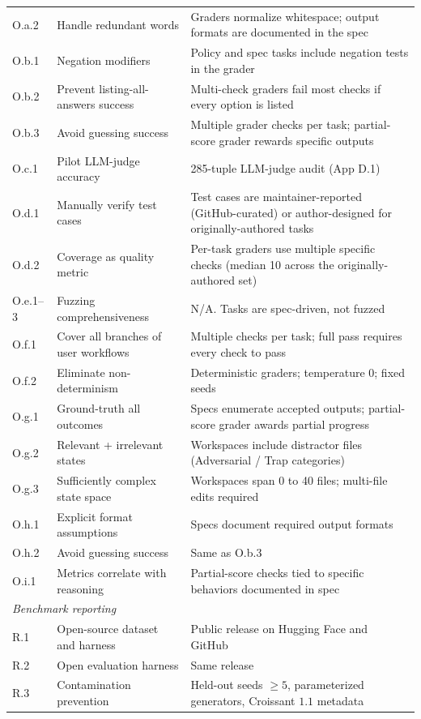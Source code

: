 \documentclass{article}
\begin{document}
\begin{table}[h]
\begin{tabular}{p{0.7cm}p{4.6cm}p{8.5cm}}
O.a.2 & Handle redundant words & Graders normalize whitespace; output formats are documented in the spec \\
O.b.1 & Negation modifiers & Policy and spec tasks include negation tests in the grader \\
O.b.2 & Prevent listing-all-answers success & Multi-check graders fail most checks if every option is listed \\
O.b.3 & Avoid guessing success & Multiple grader checks per task; partial-score grader rewards specific outputs \\
O.c.1 & Pilot LLM-judge accuracy & 285-tuple LLM-judge audit (App D.1) \\
O.d.1 & Manually verify test cases & Test cases are maintainer-reported (GitHub-curated) or author-designed for originally-authored tasks \\
O.d.2 & Coverage as quality metric & Per-task graders use multiple specific checks (median 10 across the originally-authored set) \\
O.e.1--3 & Fuzzing comprehensiveness & N/A. Tasks are spec-driven, not fuzzed \\
O.f.1 & Cover all branches of user workflows & Multiple checks per task; full pass requires every check to pass \\
O.f.2 & Eliminate non-determinism & Deterministic graders; temperature 0; fixed seeds \\
O.g.1 & Ground-truth all outcomes & Specs enumerate accepted outputs; partial-score grader awards partial progress \\
O.g.2 & Relevant + irrelevant states & Workspaces include distractor files (Adversarial / Trap categories) \\
O.g.3 & Sufficiently complex state space & Workspaces span 0 to 40 files; multi-file edits required \\
O.h.1 & Explicit format assumptions & Specs document required output formats \\
O.h.2 & Avoid guessing success & Same as O.b.3 \\
O.i.1 & Metrics correlate with reasoning & Partial-score checks tied to specific behaviors documented in spec \\
\midrule
\multicolumn{3}{l}{\textit{Benchmark reporting}} \\
R.1 & Open-source dataset and harness & Public release on Hugging Face and GitHub \\
R.2 & Open evaluation harness & Same release \\
R.3 & Contamination prevention & Held-out seeds $\geq 5$, parameterized generators, Croissant $1.1$ metadata \\

\end{tabular}
\end{table}
\end{document}
